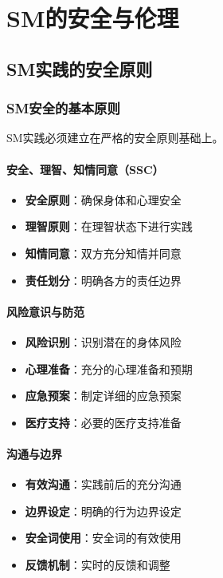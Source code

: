 \documentclass[12pt,UTF8]{ctexbook}
\begin{document}
\part{SM的安全与伦理}

\chapter{SM实践的安全原则}
\section{SM安全的基本原则}
SM实践必须建立在严格的安全原则基础上。

\subsection{安全、理智、知情同意（SSC）}
\begin{itemize}[leftmargin=2cm]
	\item \textbf{安全原则}：确保身体和心理安全
	\item \textbf{理智原则}：在理智状态下进行实践
	\item \textbf{知情同意}：双方充分知情并同意
	\item \textbf{责任划分}：明确各方的责任边界
\end{itemize}

\subsection{风险意识与防范}
\begin{itemize}[leftmargin=2cm]
	\item \textbf{风险识别}：识别潜在的身体风险
	\item \textbf{心理准备}：充分的心理准备和预期
	\item \textbf{应急预案}：制定详细的应急预案
	\item \textbf{医疗支持}：必要的医疗支持准备
\end{itemize}

\subsection{沟通与边界}
\begin{itemize}[leftmargin=2cm]
	\item \textbf{有效沟通}：实践前后的充分沟通
	\item \textbf{边界设定}：明确的行为边界设定
	\item \textbf{安全词使用}：安全词的有效使用
	\item \textbf{反馈机制}：实时的反馈和调整
\end{itemize}
\end{document}
